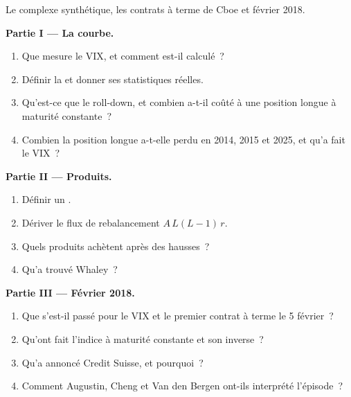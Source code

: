\begin{problem}\label{pb:s2:the-volatility-index-complex:1}
Le complexe synthétique, les contrats à terme de Cboe et février 2018.

\medskip\noindent\textbf{Partie I --- La courbe.}
\begin{enumerate}
\item Que mesure le VIX, et comment est-il calculé~?
\item Définir la  et donner ses statistiques réelles.
\item Qu'est-ce que le roll-down, et combien a-t-il coûté à une position longue à maturité constante~?
\item Combien la position longue a-t-elle perdu en 2014, 2015 et 2025, et qu'a fait le VIX~?
\end{enumerate}

\medskip\noindent\textbf{Partie II --- Produits.}
\begin{enumerate}[resume]
\item Définir un .
\item Dériver le flux de rebalancement $A\,L(L - 1)\,r$.
\item Quels produits achètent après des hausses~?
\item Qu'a trouvé Whaley~?
\end{enumerate}

\medskip\noindent\textbf{Partie III --- Février 2018.}
\begin{enumerate}[resume]
\item Que s'est-il passé pour le VIX et le premier contrat à terme le 5 février~?
\item Qu'ont fait l'indice à maturité constante et son inverse~?
\item Qu'a annoncé Credit Suisse, et pourquoi~?
\item Comment Augustin, Cheng et Van den Bergen ont-ils interprété l'épisode~?
\end{enumerate}


\end{problem}

